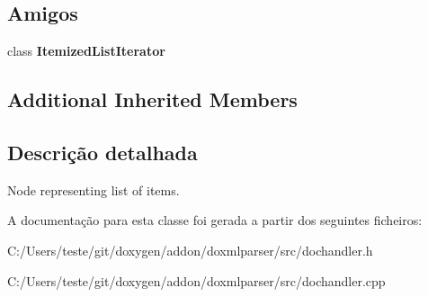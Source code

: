 \subsection*{Amigos}
\begin{DoxyCompactItemize}
\item 
\hypertarget{class_itemized_list_handler_a5a3b499fbbf2a34a8e8e167b74140467}{class {\bfseries Itemized\-List\-Iterator}}\label{class_itemized_list_handler_a5a3b499fbbf2a34a8e8e167b74140467}

\end{DoxyCompactItemize}
\subsection*{Additional Inherited Members}


\subsection{Descrição detalhada}
Node representing list of items. 



A documentação para esta classe foi gerada a partir dos seguintes ficheiros\-:\begin{DoxyCompactItemize}
\item 
C\-:/\-Users/teste/git/doxygen/addon/doxmlparser/src/dochandler.\-h\item 
C\-:/\-Users/teste/git/doxygen/addon/doxmlparser/src/dochandler.\-cpp\end{DoxyCompactItemize}

